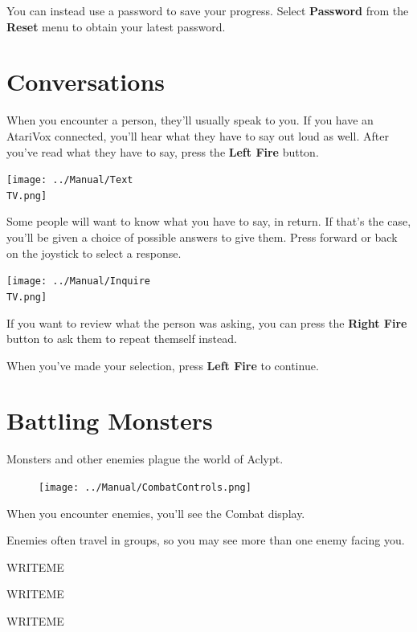 \documentclass[10pt,twocolumn,openany,article]{memoir}
\newcommand\TV{NTSC}
\newcommand\TV{PAL}
\begin{document}
You   can   instead   use   a    password   to   save   your   progress.
Select  \textbf{Password} from  the \textbf{Reset}  menu to  obtain your
latest password.

\section{Conversations}

When you encounter  a person, they'll usually speak to  you. If you have
an AtariVox  connected, you'll hear  what they have  to say out  loud as
well.   After  you've   read  what   they   have  to   say,  press   the
\textbf{Left Fire} button.

\begin{center}
  \texttt{[image: ../Manual/Text\\TV.png]}
\end{center}

Some people will want to know what you have to say, in return. If that's
the case, you'll be given a choice of possible answers to give them.
Press forward or back on the joystick to select a response.

\begin{center}
  \texttt{[image: ../Manual/Inquire\\TV.png]}
\end{center}

If you  want to  review what the  person was asking,  you can  press the
\textbf{Right Fire} button to ask them to repeat themself instead.

When you've made your selection, press \textbf{Left Fire} to continue.

\section{Battling Monsters}

Monsters and other enemies plague the world of Aclypt.

\begin{figure}[ht]
  \texttt{[image: ../Manual/CombatControls.png]}
\end{figure}

When you  encounter enemies, you'll  see the Combat display.

Enemies  often travel  in groups,  so you  may see  more than  one enemy
facing you.

WRITEME

WRITEME

WRITEME
\end{document}
